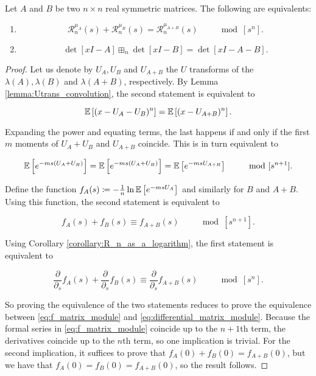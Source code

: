 \begin{theorem}
    Let $A$ and $B$ be two $n\times n$ real symmetric matrices. The following are equivalents:

    \begin{enumerate}
        \item \[ \mathcal R_n^{\mu_A}(s) + \mathcal R_n^{\mu_B}(s) = \mathcal R_n^{\mu_{A+B}}(s) \qquad \mod[s^n]. \]
        \item \[ \det[xI - A] \boxplus_n \det[xI-B] = \det[xI - A - B]. \]
    \end{enumerate}
\end{theorem}

\begin{proof}
    Let us denote by $U_A, U_B$ and $U_{A+B}$ the $U$ transforms of the $\lambda(A), \lambda(B)$ and $\lambda(A+B)$, respectively. By Lemma \ref{lemma:Utrans_convolution}, the second statement is equivalent to 

    \begin{equation*}
        \mathbb E \left[  (x - U_A - U_B)^n  \right] = \mathbb E \left[  (x - U_{A+B})^n  \right].
    \end{equation*}

    Expanding the power and equating terms, the last happens if and only if the first $m$ moments of $U_A + U_B$ and $U_{A+B}$ coincide. This is in turn equivalent to 

    \begin{equation*}
        \mathbb E \left[ e^{-ms(U_A + U_B)} \right] = \mathbb E \left[ e^{-ms(U_A + U_B)} \right] = \mathbb E \left[  e^{-msU_{A+B}}  \right] \qquad \mod [s^{n+1}].
    \end{equation*}

    Define the function $f_A(s) \coloneqq - \frac1n \ln \mathbb E \left[  e^{-msU_A}  \right]$ and similarly for $B$ and $A+B$. Using this function, the second statement is equivalent to 

    \begin{equation} \label{eq:f_matrix_module}
        f_A(s) + f_B(s) \equiv f_{A+B}(s) \qquad \mod [s^{n+1}].
    \end{equation}

    Using Corollary \ref{corollary:R_n_as_a_logarithm}, the first statement is equivalent to 

    \begin{equation} \label{eq:differential_matrix_module}
        \frac{\partial}{\partial_s} f_A(s) + \frac{\partial}{\partial_s} f_B(s) \equiv \frac{\partial}{\partial_s} f_{A+B}(s) \qquad \mod[s^n].
    \end{equation}

    So proving the equivalence of the two statements reduces to prove the equivalence between \eqref{eq:f_matrix_module} and \eqref{eq:differential_matrix_module}. Because the formal series in \eqref{eq:f_matrix_module} coincide up to the $n+1$th term, the derivatives coincide up to the $n$th term, so one implication is trivial. For the second implication, it suffices to prove that $f_A(0) + f_B(0) = f_{A+B}(0)$, but we have that $f_A(0)=f_B(0)=f_{A+B}(0)$, so the result follows.
\end{proof} 

